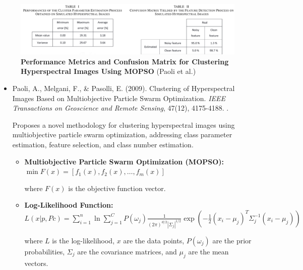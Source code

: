 \documentclass[10pt,svgnames,fragile]{beamer}
\begin{document}
\begin{frame}{}
\tiny
\vspace{-0.18cm}
\begin{figure}
    \centering
    \includegraphics[width=1\linewidth]{paoli_tables.png}
    \caption{\textbf{Performance Metrics and Confusion Matrix for Clustering Hyperspectral Images Using MOPSO} (Paoli et al.)\cite{paoliClusteringHyperspectralImages2009}}
    \label{fig:paoli_tables}
\end{figure}
\vspace{-0.3cm}
\begin{itemize}

    \item Paoli, A., Melgani, F., \& Pasolli, E. (2009). Clustering of Hyperspectral Images Based on Multiobjective Particle Swarm Optimization. \textit{IEEE Transactions on Geoscience and Remote Sensing}, 47(12), 4175-4188. \href{https://doi.org/10.1109/TGRS.2009.2023666}{\color{blue}{DOI: 10.1109/TGRS.2009.2023666}}. \cite{paoliClusteringHyperspectralImages2009}
    
    {\color{gray}Proposes a novel methodology for clustering hyperspectral images using multiobjective particle swarm optimization, addressing class parameter estimation, feature selection, and class number estimation.}
    \begin{itemize} \tiny
    \item \textbf{Multiobjective Particle Swarm Optimization (MOPSO):}
    \(
    \min F(x) = [f_1(x), f_2(x), \ldots, f_m(x)]
    \)
    
    where \( F(x) \) is the objective function vector.
    \item \textbf{Log-Likelihood Function:}
    \(
    L(x|p,Pc) = \sum_{i=1}^{n} \ln \sum_{j=1}^{C} P(\omega_j) \frac{1}{(2\pi)^{d/2} |\Sigma_j|^{1/2}} \exp \left( -\frac{1}{2} (x_i - \mu_j)^T \Sigma_j^{-1} (x_i - \mu_j) \right)
    \)
    
    where \( L \) is the log-likelihood, \( x \) are the data points, \( P(\omega_j) \) are the prior probabilities, \( \Sigma_j \) are the covariance matrices, and \( \mu_j \) are the mean vectors.


\end{itemize}
\end{itemize}
\end{frame}
\end{document}
